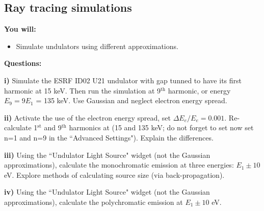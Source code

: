 \subsection{Ray tracing simulations}

\begin{youwillbox}
\textbf{You will:}

\begin{itemize}
    \item Simulate undulators using different approximations.
\end{itemize}
\end{youwillbox}

\begin{questionsbox}
\textbf{Questions:}

\textbf{i)} Simulate the ESRF ID02 U21 undulator with gap tunned to have its first harmonic at 15 keV. Then run the simulation at 9$^\text{th}$ harmonic, or energy $E_9= 9 E_1$ = 135 keV. Use Gaussian and neglect electron energy spread.

\textbf{ii)} Activate the use of the electron energy spread, set $\Delta E_e/E_e = 0.001$. Re-calculate  1$^\text{st}$ and  9$^\text{th}$ harmonics at (15 and 135 keV; do not forget to set now set n=1 and n=9 in the ``Advanced Settings"). Explain the differences.

\textbf{iii)} Using the ``Undulator Light Source" widget (not the Gaussian approximations), calculate the monochromatic emission at three energies: $E_1\pm 10$ eV. Explore methods of calculating source size (via back-propagation).

\textbf{iv)} Using the ``Undulator Light Source" widget (not the Gaussian approximations), calculate the polychromatic emission at $E_1\pm 10$ eV.


\end{questionsbox}
